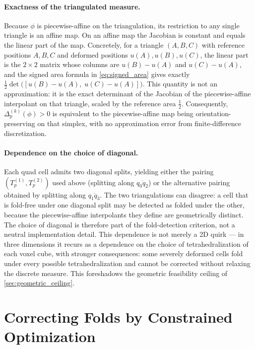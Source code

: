 \paragraph{Exactness of the triangulated measure.}
Because $\phi$ is piecewise-affine on the triangulation, its restriction to any single triangle is an affine map. On an affine map the Jacobian is constant and equals the linear part of the map. Concretely, for a triangle $(A, B, C)$ with reference positions $A, B, C$ and deformed positions $u(A), u(B), u(C)$, the linear part is the $2\times 2$ matrix whose columns are $u(B)-u(A)$ and $u(C)-u(A)$, and the signed area formula in \autoref{eq:signed_area} gives exactly $\tfrac{1}{2}\det\bigl([u(B)-u(A),\; u(C)-u(A)]\bigr)$. This quantity is not an approximation: it is the exact determinant of the Jacobian of the piecewise-affine interpolant on that triangle, scaled by the reference area $\tfrac{1}{2}$. Consequently, $\Delta^{(k)}_p(\phi) > 0$ is equivalent to the piecewise-affine map being orientation-preserving on that simplex, with no approximation error from finite-difference discretization.

\paragraph{Dependence on the choice of diagonal.}
Each quad cell admits two diagonal splits, yielding either the pairing $(T^{(1)}_p, T^{(2)}_p)$ used above (splitting along $\overline{q_0 q_2}$) or the alternative pairing obtained by splitting along $\overline{q_1 q_3}$. The two triangulations can disagree: a cell that is fold-free under one diagonal split may be detected as folded under the other, because the piecewise-affine interpolants they define are geometrically distinct. The choice of diagonal is therefore part of the fold-detection criterion, not a neutral implementation detail. This dependence is not merely a 2D quirk — in three dimensions it recurs as a dependence on the choice of tetrahedralization of each voxel cube, with stronger consequences: some severely deformed cells fold under every possible tetrahedralization and cannot be corrected without relaxing the discrete measure. This foreshadows the geometric feasibility ceiling of \autoref{sec:geometric_ceiling}.


\section{Correcting Folds by Constrained Optimization}
\label{sec:optimization_formulation}

